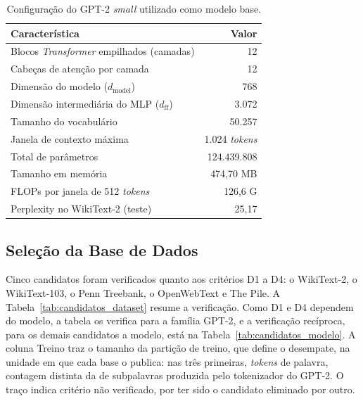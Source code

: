 \begin{table}[htb]
\centering
\caption{Configuração do GPT-2 \textit{small} utilizado como modelo base.}
\label{tab:gpt2_config}
\small
\begin{tabular}{p{6.5cm} r}
\hline
\textbf{Característica} & \textbf{Valor} \\
\hline
Blocos \textit{Transformer} empilhados (camadas) & 12 \\
Cabeças de atenção por camada & 12 \\
Dimensão do modelo ($d_{\text{model}}$) & 768 \\
Dimensão intermediária do MLP ($d_{\text{ff}}$) & 3.072 \\
Tamanho do vocabulário & 50.257 \\
Janela de contexto máxima & 1.024 \textit{tokens} \\
Total de parâmetros & 124.439.808 \\
Tamanho em memória & 474,70 MB \\
FLOPs por janela de 512 \textit{tokens} & 126,6 G \\
Perplexity no WikiText-2 (teste) & 25,17 \\
\hline
\end{tabular}
\end{table}

\subsection{Seleção da Base de Dados}\label{sec:dataset}

Cinco candidatos foram verificados quanto aos critérios D1 a D4:
o WikiText-2, o WikiText-103, o Penn Treebank, o
OpenWebText \cite{Gokaslan2019} e The Pile. A Tabela~\ref{tab:candidatos_dataset} resume a verificação.
Como D1 e D4 dependem do modelo, a tabela os verifica para a família GPT-2, e a verificação
recíproca, para os demais candidatos a modelo, está na Tabela~\ref{tab:candidatos_modelo}.
A coluna Treino traz o tamanho da partição de treino, que define o desempate, na unidade em
que cada base o publica: nas três primeiras, \textit{tokens} de palavra, contagem distinta da
de subpalavras produzida pelo tokenizador do GPT-2. O traço
indica critério não verificado, por ter sido o candidato eliminado por outro.

